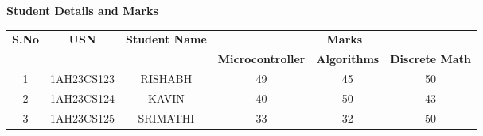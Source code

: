 \documentclass{article}
\begin{document}
	
	\begin{table}[h]
		\centering  %
		\textbf{\Large Student Details and Marks}
		\vspace{0.1in}
		\begin{tabular}{|c|c|c|c|c|c|}
			\hline
			\multirow{2}{*}{\textbf{S.No}} & \multirow{2}{*}{\textbf{USN}} &
			\multirow{2}{*}{\textbf{Student Name}} & \multicolumn{3}{c|}{\textbf{Marks}} \\
			\cline{4-6}
			& & & \textbf{Microcontroller} & \textbf{Algorithms} & \textbf{Discrete Math} \\
			\hline
			1 & 1AH23CS123 & RISHABH & 49 & 45 & 50 \\
			\hline
			2 & 1AH23CS124 & KAVIN & 40 & 50 & 43 \\
			\hline
			3 & 1AH23CS125 & SRIMATHI & 33 & 32 & 50 \\
			\hline
		\end{tabular}
	\end{table}
	
\end{document}
